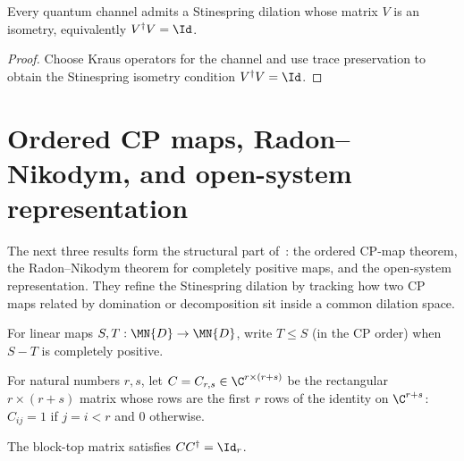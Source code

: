 \begin{theorem}
    \label{thm:exists_stinespring_isometry_of_cptp}
    \leanok
    Every quantum channel admits a Stinespring dilation whose matrix $V$ is an
    isometry, equivalently $V^\dagger V = \Id$.
\end{theorem}

\begin{proof}\leanok
    Choose Kraus operators for the channel and use trace preservation to obtain
    the Stinespring isometry condition $V^\dagger V = \Id$.
\end{proof}

\section{Ordered CP maps, Radon--Nikodym, and open-system representation}
\label{sec:ordered_cp}

The next three results form the structural part of~\cite[Theorems~2.3--2.5]{Wolf2012Quantum}:
the ordered CP-map theorem, the Radon--Nikodym theorem for completely positive
maps, and the open-system representation. They refine the Stinespring dilation
by tracking how two CP maps related by domination or decomposition sit inside
a common dilation space.

\begin{definition}\label{def:cp_dominates}
    \leanok
    For linear maps $S, T : \MN{D} \to \MN{D}$, write $T \le S$ (in the CP
    order) when $S - T$ is completely positive.
\end{definition}

\begin{definition}\label{def:block_top_rows}
    \leanok
    For natural numbers $r, s$, let $C = C_{r,s} \in \C^{r \times (r+s)}$ be the
    rectangular $r \times (r+s)$ matrix whose rows are the first $r$ rows
    of the identity on $\C^{r+s}$: $C_{ij} = 1$ if $j = i < r$ and $0$
    otherwise.
\end{definition}

\begin{lemma}[$C$ is a co-isometry]\label{lem:block_top_rows_co_isometry}
    \leanok
    The block-top matrix satisfies $C C^\dagger = \Id_r$.
\end{lemma}

